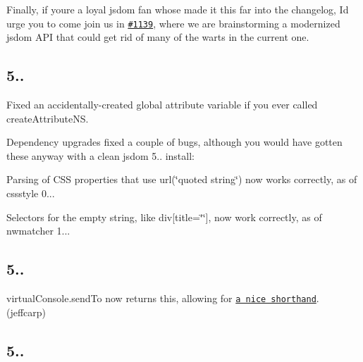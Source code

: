 Finally, if you\textquotesingle{}re a loyal jsdom fan whose made it this far into the changelog, I\textquotesingle{}d urge you to come join us in \href{https://github.com/tmpvar/jsdom/issues/1139}{\tt \#1139}, where we are brainstorming a modernized jsdom A\+PI that could get rid of many of the warts in the current one.

\subsection*{5..}


\begin{DoxyItemize}
\item Fixed an accidentally-\/created global {\ttfamily attribute} variable if you ever called {\ttfamily create\+Attribute\+NS}.
\item Dependency upgrades fixed a couple of bugs, although you would have gotten these anyway with a clean jsdom 5.. install\+:
\begin{DoxyItemize}
\item Parsing of C\+SS properties that use {\ttfamily url(\char`\"{}quoted string\char`\"{})} now works correctly, as of cssstyle 0...
\item Selectors for the empty string, like {\ttfamily div\mbox{[}title=\char`\"{}\char`\"{}\mbox{]}}, now work correctly, as of nwmatcher 1...
\end{DoxyItemize}
\end{DoxyItemize}

\subsection*{5..}


\begin{DoxyItemize}
\item {\ttfamily virtual\+Console.\+send\+To} now returns {\ttfamily this}, allowing for \href{https://github.com/tmpvar/jsdom/tree/60ccb9b318d0bae8fe37e19af5af444b9c98ddac#forward-a-windows-console-output-to-the-iojs-console}{\tt a nice shorthand}. (jeffcarp)
\end{DoxyItemize}

\subsection*{5..}


